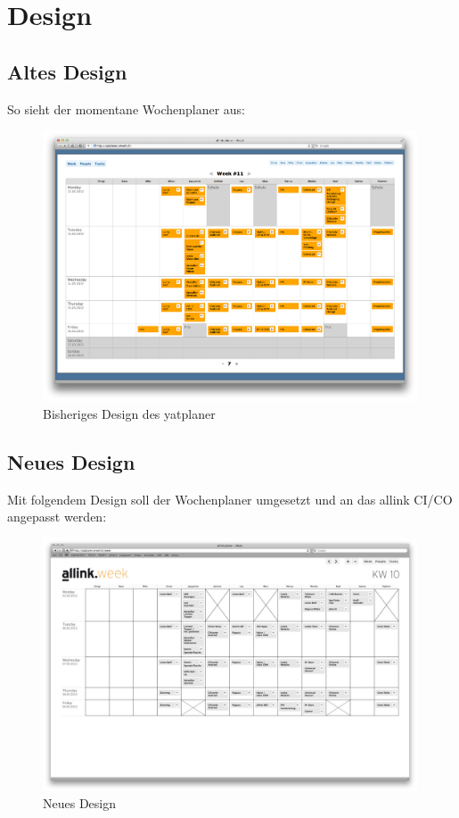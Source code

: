 \section{Design}
\subsection{Altes Design}
So sieht der momentane Wochenplaner aus:
\begin{figure}[!ht]
\begin{center}
\includegraphics[width=0.99\textwidth,angle=0]{./bilder/yatplaner.png}
\caption{Bisheriges Design des yatplaner}
\end{center}
\end{figure}

\clearpage
\subsection{Neues Design}
Mit folgendem Design soll der Wochenplaner umgesetzt und an das allink CI/CO angepasst werden:
\begin{figure}[!ht]
\begin{center}
\includegraphics[width=0.99\textwidth,angle=0]{./bilder/wochenplaner.jpg}
\caption{Neues Design}
\end{center}
\end{figure}

